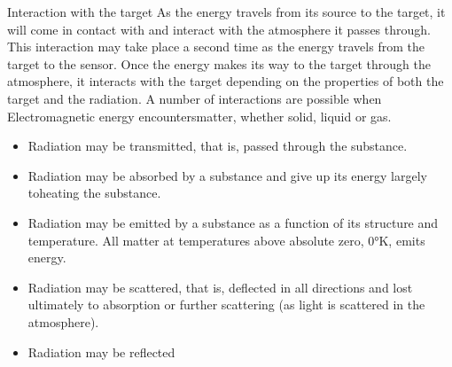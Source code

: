 \documentclass[10pt]{beamer}
\begin{document}
\begin{frame}{Interaction with the target}
  As the energy travels from its source to the target, it will come in contact with and interact
with the atmosphere it passes through. This interaction may take place a second time as the
energy travels from the target to the sensor. Once the energy makes its way to the target
through the atmosphere, it interacts with the target depending on the properties of both the
target and the radiation. A number of interactions are possible when Electromagnetic energy
encountersmatter, whether solid, liquid or gas.
  \begin{itemize}
    \item Radiation may be transmitted, that is, passed through the substance.
    \item Radiation may be absorbed by a substance and give up its energy largely toheating the
  substance.
    \item Radiation may be emitted by a substance as a function of its structure and
  temperature. All matter at temperatures above absolute zero, 0°K, emits energy.
    \item Radiation may be scattered, that is, deflected in all directions and lost ultimately to
  absorption or further scattering (as light is scattered in the atmosphere).
    \item Radiation may be reflected
  \end{itemize}
\end{frame}
\end{document}
